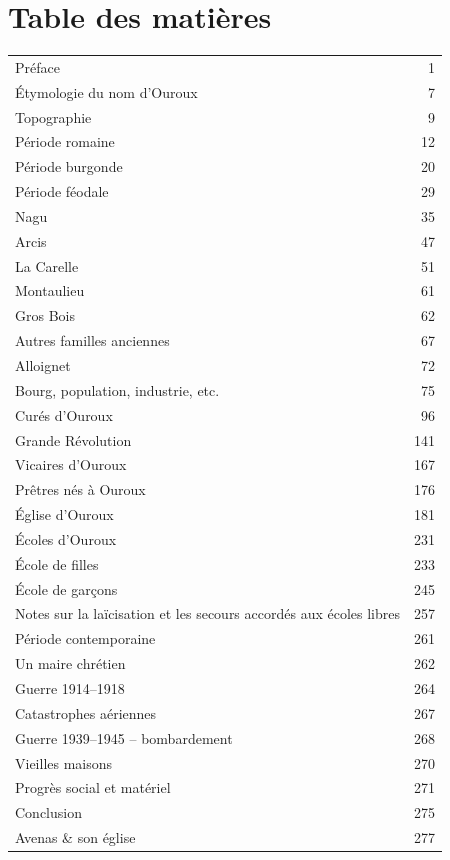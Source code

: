 \clearpage
\fancyhead[R]{}
\iffalse
\chapter*{Table des matières}

\begin{longtable}{@{}p{}r@{}}
Préface & 1 \\
Étymologie du nom d'Ouroux & 7 \\
Topographie & 9 \\
Période romaine & 12 \\
Période burgonde & 20 \\
Période féodale & 29 \\
Nagu & 35 \\
Arcis & 47 \\
La Carelle & 51 \\
Montaulieu & 61 \\
Gros Bois & 62 \\
Autres familles anciennes & 67 \\
Alloignet & 72 \\
Bourg, population, industrie, etc. & 75 \\
Curés d'Ouroux & 96 \\
Grande Révolution & 141 \\
Vicaires d'Ouroux & 167 \\
Prêtres nés à Ouroux & 176 \\
Église d'Ouroux & 181 \\
Écoles d'Ouroux & 231 \\
\quad École de filles & 233 \\
\quad École de garçons & 245 \\
\quad Notes sur la laïcisation et les secours accordés aux écoles libres & 257 \\
Période contemporaine & 261 \\
\quad Un maire chrétien & 262 \\
\quad Guerre 1914--1918 & 264 \\
\quad Catastrophes aériennes & 267 \\
\quad Guerre 1939--1945 -- bombardement & 268 \\
\quad Vieilles maisons & 270 \\
\quad Progrès social et matériel & 271 \\
Conclusion & 275 \\
Avenas \& son église & 277 \\
\end{longtable}

